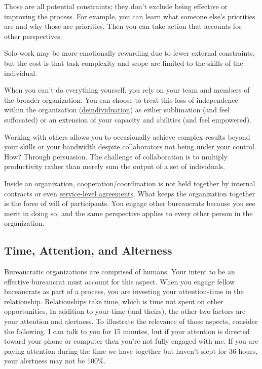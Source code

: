 Those are all potential constraints; they don't exclude being effective or improving the process. 
For example, you can learn what someone else's priorities are and why those are priorities. Then you can take action that accounts for other perspectives.

Solo work may be more emotionally rewarding due to fewer external constraints, but the cost is that task complexity and scope are limited to the skills of the individual. 


When you can't do everything yourself, you rely on your team and members of the broader organization. You can choose to treat this loss of independence within the organization (\href{https://en.wikipedia.org/wiki/Deindividuation}{deindividuation}) 
\iftoggle{WPinmargin}{\marginpar{$>$Wikipedia: deindividuation}}{ }
as either sublimation (and feel suffocated) or an extension of your capacity and abilities (and feel empowered).

Working with others allows you to occasionally achieve complex results beyond your skills or your bandwidth despite  collaborators not being under your control. How? Through persuasion. 
The challenge of collaboration is to multiply productivity rather than merely sum the output of a set of individuals. 

Inside an organization, cooperation/coordination is not held together by internal contracts or even \href{https://en.wikipedia.org/wiki/Service-level_agreement}{service-level agreements}. 
%
\iftoggle{WPinmargin}{\marginpar{$>$Wikipedia: Service-level agreements}}{ }
What keeps the organization together is the force of will of participants. 
You engage other bureaucrats because you see merit in doing so, and the same perspective applies to every other person in the organization.

\subsection*{Time, Attention, and Alterness}

Bureaucratic organizations are comprised of humans. Your intent to be an effective bureaucrat must account for this aspect.
When you engage fellow bureaucrats as part of a process, you are investing your \gls{attention-time} in the relationship. Relationships take time, which is time not spent on other opportunities. In addition to your time (and theirs), the other two factors are your attention and alertness. To illustrate the relevance of those aspects, consider the following. I can talk to you for 15 minutes, but if your attention is directed toward your phone or computer then you're not fully engaged with me. If you are paying attention during the time we have together but haven't slept for 36 hours, your alertness may not be 100\%. 

